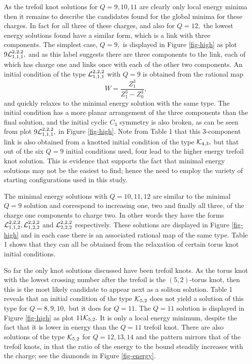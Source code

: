 \documentclass[12pt]{article}
\newcommand{\be}{\begin{equation}}
\newcommand{\ee}{\end{equation}}
\begin{document}
As the trefoil knot solutions for $Q=9,10,11$ are clearly only local
energy minima then it remains to describe the candidates found for
the global minima for these charges. In fact for all three of these
charges, and also for $Q=12,$ the lowest energy solutions found have
a similar form, which is a link with three components. The simplest
case, $Q=9,$ is displayed in Figure \ref{fig-high} as plot
 $9{\cal L}_{1,1,1}^{2,2,2},$ and as this label suggests there are three
components to the link, each of which has charge one and links once
with each of the other two components. An initial condition 
of the type ${\cal L}_{1,1,1}^{2,2,2}$ with $Q=9$ 
is obtained from the rational map
\be W=\frac{Z_1^3}{Z_1^3-Z_0^3},\label{map9}\ee and quickly relaxes
to the minimal energy solution with the same type. The initial
condition has a more planar arrangement of the three components than
the final solution, and the initial cyclic $C_3$ symmetry is also
broken, as can be seen from plot $9{\cal L}_{1,1,1}^{2,2,2},$
in Figure \ref{fig-high}. Note from Table 1
that this 3-component link is also obtained from a knotted initial
condition of the type ${\cal K}_{4,3},$ but that out of the six
$Q=9$ initial conditions used, four lead to the higher energy trefoil
knot solution. This is evidence that supports the fact that minimal
energy solutions may not be the easiest to find; hence the need to
employ the variety of starting configurations used in this study.

The minimal energy solutions with $Q=10,11,12$ are similar to the
minimal $Q=9$ solution and correspond to increasing one, two and
finally all three, of the charge one components to charge two. In
other words they have the forms ${\cal L}_{1,1,2}^{2,2,2},{\cal
L}_{1,2,2}^{2,2,2}$ and ${\cal L}_{2,2,2}^{2,2,2}$ respectively.
These solutions are displayed in Figure \ref{fig-high}
 and in each case there is
an associated rational map of the same type. Table 1 shows that they
can all be obtained from the relaxation of certain torus knot
initial conditions.

So far the only knot solutions discussed have been trefoil knots. As
the torus knot with the lowest crossing number after the trefoil is
the $(5,2)$-torus knot, then this is the most likely candidate to
appear next as a soliton solution. Table 1 reveals that an initial
condition of the type ${\cal K}_{5,2}$ does not yield a solution of
this type for $Q=8,9,10,$ but it does for $Q=11.$ The $Q=11$
solution is displayed in Figure \ref{fig-high}
 as plot $11{\cal K}_{5,2}.$ It is
only a local energy minimum, despite the fact that it is lower in
energy than the $Q=11$ trefoil knot. There are also solutions of the
type ${\cal K}_{5,2}$ for $Q=12,13,14$ and the pattern mirrors that
of the trefoil knots, in that the ratio of the energy to the 
bound steadily increases with the charge; see the diamonds in 
Figure \ref{fig-energy}.
\end{document}
